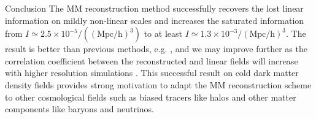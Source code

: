 \begin{section}{Conclusion}
  \label{sec:conclusion}
  The MM reconstruction method successfully recovers the lost linear
  information on mildly non-linear scales and increases the saturated
  information from $I \simeq 2.5 \times 10^{-5}/(\mathrm{(Mpc/h)}^3)$
  to at least $I \simeq 1.3 \times 10^{-3}/\mathrm{(Mpc/h)}^3$.  The result is
  better than previous methods,
  e.g. \cite{bib:Mark2006,bib:Mark2009,bib:Zhang2011,bib:Yu2012}, and
  we may improve further as the correlation coefficient between the
  reconstructed and linear fields will increase with higher resolution
  simulations \cite{bib:ZhuH2016}.  This successful result on cold
  dark matter density fields provides strong motivation to adapt the
  MM reconstruction scheme to other cosmological fields such as biased
  tracers like halos and other matter components like baryons and
  neutrinos.



\end{section}
